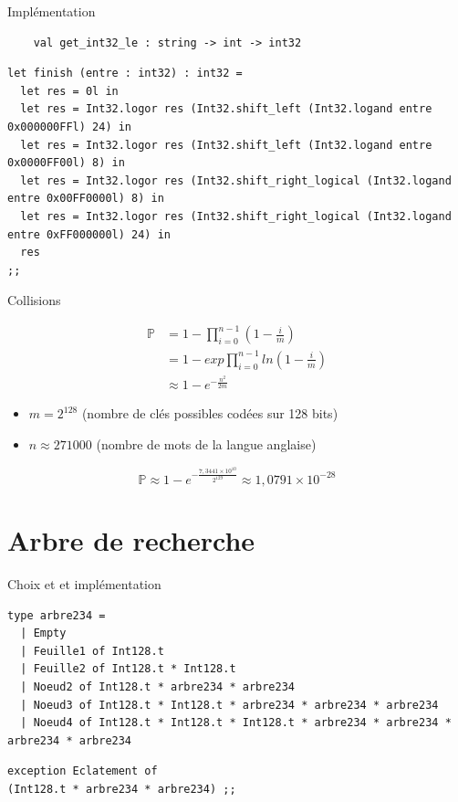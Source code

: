 \documentclass[11pt]{beamer}
\begin{document}
\begin{frame}[fragile]{Implémentation\cite{md5}}
\begin{lstlisting}
    val get_int32_le : string -> int -> int32
\end{lstlisting}  
\begin{lstlisting}
let finish (entre : int32) : int32 =
  let res = 0l in
  let res = Int32.logor res (Int32.shift_left (Int32.logand entre 0x000000FFl) 24) in 
  let res = Int32.logor res (Int32.shift_left (Int32.logand entre 0x0000FF00l) 8) in 
  let res = Int32.logor res (Int32.shift_right_logical (Int32.logand entre 0x00FF0000l) 8) in 
  let res = Int32.logor res (Int32.shift_right_logical (Int32.logand entre 0xFF000000l) 24) in 
  res
;;
\end{lstlisting} 

\end{frame}

\begin{frame}{Collisions}

\begin{align}
\mathbb{P} &= 1 - \prod_{i = 0}^{n -1} ( 1 - \frac{i}{m})\\
&= 1 - exp \prod_{i = 0}^{n -1} ln( 1 - \frac{i}{m})\\
&\approx 1 - e^{-\frac{n^2}{2m}}
\end{align}

\begin{itemize}
\item $m = 2^{128}$ (nombre de clés possibles codées sur 128 bits)
\item $n \approx 271000$ (nombre de mots de la langue anglaise)
\end{itemize}

$$\mathbb{P}\approx 1 - e^{-\frac{7,3441\times10^{10}}{2^{129}}} \approx 1,0791\times10^{-28}$$


\end{frame}

\section{Arbre de recherche}

\begin{frame}[fragile]{Choix et et implémentation}

\bigskip \begin{lstlisting}
type arbre234 = 
  | Empty
  | Feuille1 of Int128.t
  | Feuille2 of Int128.t * Int128.t
  | Noeud2 of Int128.t * arbre234 * arbre234 
  | Noeud3 of Int128.t * Int128.t * arbre234 * arbre234 * arbre234 
  | Noeud4 of Int128.t * Int128.t * Int128.t * arbre234 * arbre234 * arbre234 * arbre234 
\end{lstlisting} 

\bigskip \begin{lstlisting}
exception Eclatement of 
(Int128.t * arbre234 * arbre234) ;;
\end{lstlisting} \bigskip


\end{frame}
\end{document}
